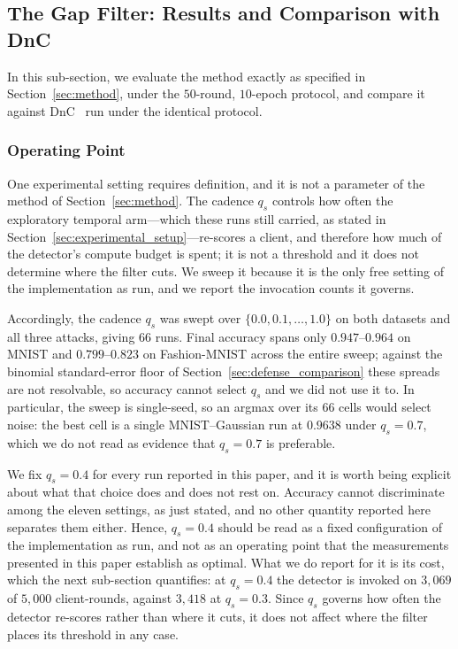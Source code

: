 \documentclass[journal]{IEEEtran}
\begin{document}
\subsection{The Gap Filter: Results and Comparison with DnC}
\label{sec:af_results}

In this sub-section, we evaluate the method exactly as specified in Section~\ref{sec:method}, under the $50$-round, $10$-epoch protocol, and compare it against DnC~\cite{shejwalkar2021manipulating} run under the identical protocol.

\subsubsection{Operating Point}
One experimental setting requires definition, and it is not a parameter of the method of Section~\ref{sec:method}. The cadence $q_s$ controls how often the exploratory temporal arm---which these runs still carried, as stated in Section~\ref{sec:experimental_setup}---re-scores a client, and therefore how much of the detector's compute budget is spent; it is not a threshold and it does not determine where the filter cuts. We sweep it because it is the only free setting of the implementation as run, and we report the invocation counts it governs.

Accordingly, the cadence $q_s$ was swept over $\{0.0, 0.1, \dots, 1.0\}$ on both datasets and all three attacks, giving $66$ runs. Final accuracy spans only $0.947$--$0.964$ on MNIST and $0.799$--$0.823$ on Fashion-MNIST across the entire sweep; against the binomial standard-error floor of Section~\ref{sec:defense_comparison} these spreads are not resolvable, so accuracy cannot select $q_s$ and we did not use it to. In particular, the sweep is single-seed, so an argmax over its $66$ cells would select noise: the best cell is a single MNIST--Gaussian run at $0.9638$ under $q_s = 0.7$, which we do not read as evidence that $q_s = 0.7$ is preferable.

We fix $q_s = 0.4$ for every run reported in this paper, and it is worth being explicit about what that choice does and does not rest on. Accuracy cannot discriminate among the eleven settings, as just stated, and no other quantity reported here separates them either. Hence, $q_s = 0.4$ should be read as a fixed configuration of the implementation as run, and not as an operating point that the measurements presented in this paper establish as optimal. What we do report for it is its cost, which the next sub-section quantifies: at $q_s = 0.4$ the detector is invoked on $3{,}069$ of $5{,}000$ client-rounds, against $3{,}418$ at $q_s = 0.3$. Since $q_s$ governs how often the detector re-scores rather than where it cuts, it does not affect where the filter places its threshold in any case.
\end{document}
